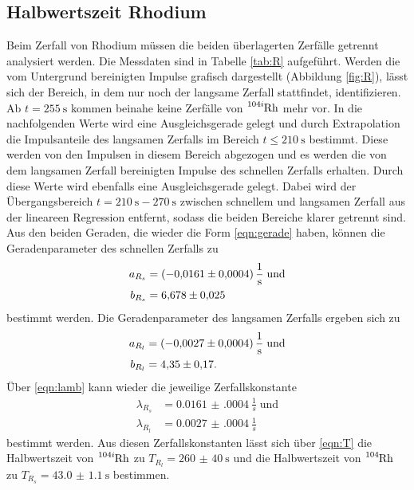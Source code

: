 \subsection{Halbwertszeit Rhodium}
\label{Rhodium}
Beim Zerfall von Rhodium müssen die beiden überlagerten Zerfälle getrennt analysiert werden. Die Messdaten sind in Tabelle \ref{tab:R} aufgeführt. Werden die vom Untergrund bereinigten Impulse grafisch dargestellt (Abbildung \ref{fig:R}), lässt sich der Bereich, in dem nur noch der langsame Zerfall stattfindet, identifizieren. Ab $t=\SI{255}{\s}$ kommen beinahe keine Zerfälle von $\ce{^{104i}Rh}$ mehr vor. In die nachfolgenden Werte wird eine Ausgleichsgerade gelegt und durch Extrapolation die Impulsanteile des langsamen Zerfalls im Bereich $t\leq\SI{210}{\s}$ bestimmt. Diese werden von den Impulsen in diesem Bereich abgezogen und es werden die von dem langsamen Zerfall bereinigten Impulse des schnellen Zerfalls erhalten. Durch diese Werte wird ebenfalls eine Ausgleichsgerade gelegt. Dabei wird der Übergangsbereich $t=\SI{210}{\s}-\SI{270}{\s}$ zwischen schnellem und langsamen Zerfall aus der lineareen Regression entfernt, sodass die beiden Bereiche klarer getrennt sind. Aus den beiden Geraden, die wieder die Form \eqref{eqn:gerade} haben, können die Geradenparameter des schnellen Zerfalls zu 
\begin{align*}
a_{R_s} & = \SI{-0.0161(0004)}{\frac{1}{\s}} \;\text{und}  \\
b_{R_s} & = \num{6.678(025)}
\end{align*}
bestimmt werden. Die Geradenparameter des langsamen Zerfalls ergeben sich zu 
\begin{align*}
a_{R_l} & =\SI{-0.0027(0004)}{\frac{1}{\s}} \;\text{und} \\ 
b_{R_l} & =\num{4.35(17)}.
\end{align*} 
Über \eqref{eqn:lamb} kann wieder die jeweilige Zerfallskonstante
\begin{align*}
 \lambda_{R_s} & = \SI{0.0161(0004)}{\frac{1}{s}}  \; \text{und}\\
 \lambda_{R_l} & = \SI{0.0027(0004)}{\frac{1}{s}}
 \end{align*}
 bestimmt werden. Aus diesen Zerfallskonstanten lässt sich über \eqref{eqn:T} die Halbwertszeit von $\ce{^{104i}Rh}$ zu $T_{R_l}=\SI{260(40)}{\s}$ und die Halbwertszeit von $\ce{^{104}Rh}$ zu $T_{R_s}=\SI{43.0(11)}{\s}$ bestimmen.



